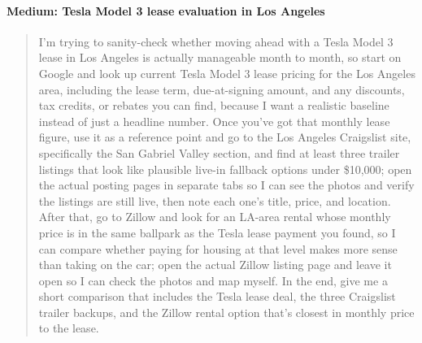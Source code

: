 \documentclass{article}
\theoremstyle{plain}
\theoremstyle{definition}
\theoremstyle{remark}
\begin{document}
\paragraph{Medium: Tesla Model 3 lease evaluation in Los Angeles}
\begin{quote}
\small
I'm trying to sanity-check whether moving ahead with a Tesla Model 3 lease in Los Angeles is actually manageable month to month, so start on Google and look up current Tesla Model 3 lease pricing for the Los Angeles area, including the lease term, due-at-signing amount, and any discounts, tax credits, or rebates you can find, because I want a realistic baseline instead of just a headline number. Once you've got that monthly lease figure, use it as a reference point and go to the Los Angeles Craigslist site, specifically the San Gabriel Valley section, and find at least three trailer listings that look like plausible live-in fallback options under \$10,000; open the actual posting pages in separate tabs so I can see the photos and verify the listings are still live, then note each one's title, price, and location. After that, go to Zillow and look for an LA-area rental whose monthly price is in the same ballpark as the Tesla lease payment you found, so I can compare whether paying for housing at that level makes more sense than taking on the car; open the actual Zillow listing page and leave it open so I can check the photos and map myself. In the end, give me a short comparison that includes the Tesla lease deal, the three Craigslist trailer backups, and the Zillow rental option that's closest in monthly price to the lease.
\end{quote}
\end{document}
